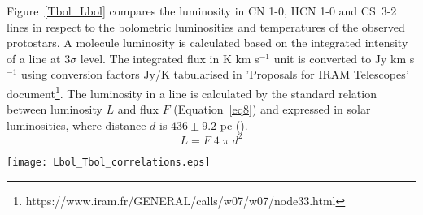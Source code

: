 \documentclass{aa}
\begin{document}
\begin{appendix}
Figure~\ref{Tbol_Lbol} compares the luminosity in CN 1-0, HCN 1-0 and \mbox{CS 3-2} lines in respect to the bolometric luminosities and temperatures of the observed protostars. A molecule luminosity is calculated based on the integrated intensity of a line at 3$\sigma$ level. The integrated flux in K km s$^{-1}$ unit is converted to Jy km s$^{-1}$ using conversion factors Jy/K tabularised in 'Proposals for IRAM Telescopes' document\footnote{https://www.iram.fr/GENERAL/calls/w07/w07/node33.html}. 
The luminosity in a line is calculated by the standard relation between luminosity $L$ and flux $F$ (Equation~\ref{eq8}) and expressed in solar luminosities, where distance $d$ is $436 \pm 9.2$ pc (\citealt{Ort17}).
\begin{equation} 
\label{eq8} 
L = F \; 4 \; \pi \; d^{2}
\end{equation}


\hspace*{-1.5in}
\begin{figure*} 
\texttt{[image: Lbol\_Tbol\_correlations.eps]} 
\caption{Correlations of lines luminosity with bolometric luminosity and temperature of protostars. Class 0 protostars are marked with red, while Class I with blue colour. The Pearson coefficient of the correlation (r) is shown.}
\label{Tbol_Lbol} 
\end{figure*}


\end{appendix}
\end{document}
